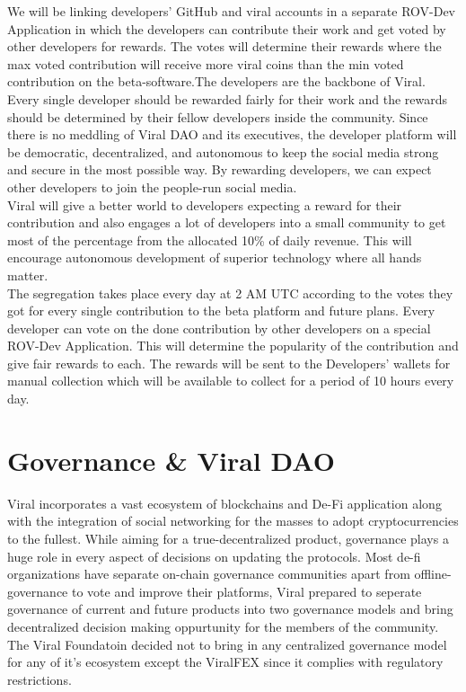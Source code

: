 \documentclass[10pt]{article}
\begin{document}
We will be linking developers' GitHub and viral accounts in a separate ROV-Dev Application in which the developers can contribute their work and get voted by other developers for rewards. The votes will determine their rewards where the max voted contribution will receive more viral coins than the min voted contribution on the beta-software.The developers are the backbone of Viral. Every single developer should be rewarded fairly for their work and the rewards should be determined by their fellow developers inside the community. Since there is no meddling of Viral DAO and its executives, the developer platform will be democratic, decentralized, and autonomous to keep the social media strong and secure in the most possible way. By rewarding developers, we can expect other developers to join the people-run social media.\\

Viral will give a better world to developers expecting a reward for their contribution and also engages a lot of developers into a small community to get most of the percentage from the allocated 10\% of daily revenue. This will encourage autonomous development of superior technology where all hands matter. \\

The segregation takes place every day at 2 AM UTC according to the votes they got for every single contribution to the beta platform and future plans. Every developer can vote on the done contribution by other developers on a special ROV-Dev Application. This will determine the popularity of the contribution and give fair rewards to each. The rewards will be sent to the Developers' wallets for manual collection which will be available to collect for a period of 10 hours every day.\\

\section{Governance \& Viral DAO}

Viral incorporates a vast ecosystem of blockchains and De-Fi application along with the integration of social networking for the masses to adopt cryptocurrencies to the fullest. While aiming for a true-decentralized product, governance plays a huge role in every aspect of decisions on updating the protocols. Most de-fi organizations have separate on-chain governance communities apart from offline-governance to vote and improve their platforms, Viral prepared to seperate governance of current and future products into two governance models and bring decentralized decision making oppurtunity for the members of the community. The Viral Foundatoin decided not to bring in any centralized governance model for any of it's ecosystem except the ViralFEX since it complies with regulatory restrictions.\\
\end{document}

